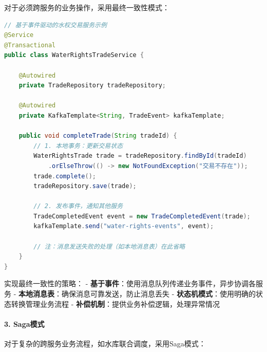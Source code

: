 对于必须跨服务的业务操作，采用最终一致性模式：

\begin{lstlisting}[language=Java]
// 基于事件驱动的水权交易服务示例
@Service
@Transactional
public class WaterRightsTradeService {
    
    @Autowired
    private TradeRepository tradeRepository;
    
    @Autowired
    private KafkaTemplate<String, TradeEvent> kafkaTemplate;
    
    public void completeTrade(String tradeId) {
        // 1. 本地事务：更新交易状态
        WaterRightsTrade trade = tradeRepository.findById(tradeId)
            .orElseThrow(() -> new NotFoundException("交易不存在"));
        trade.complete();
        tradeRepository.save(trade);
        
        // 2. 发布事件，通知其他服务
        TradeCompletedEvent event = new TradeCompletedEvent(trade);
        kafkaTemplate.send("water-rights-events", event);
        
        // 注：消息发送失败的处理（如本地消息表）在此省略
    }
}
\end{lstlisting}

实现最终一致性的策略： -
\textbf{基于事件}：使用消息队列传递业务事件，异步协调各服务 -
\textbf{本地消息表}：确保消息可靠发送，防止消息丢失 -
\textbf{状态机模式}：使用明确的状态转换管理业务流程 -
\textbf{补偿机制}：提供业务补偿逻辑，处理异常情况

\paragraph{3. Saga模式}\label{sagaux6a21ux5f0f}

对于复杂的跨服务业务流程，如水库联合调度，采用Saga模式：

